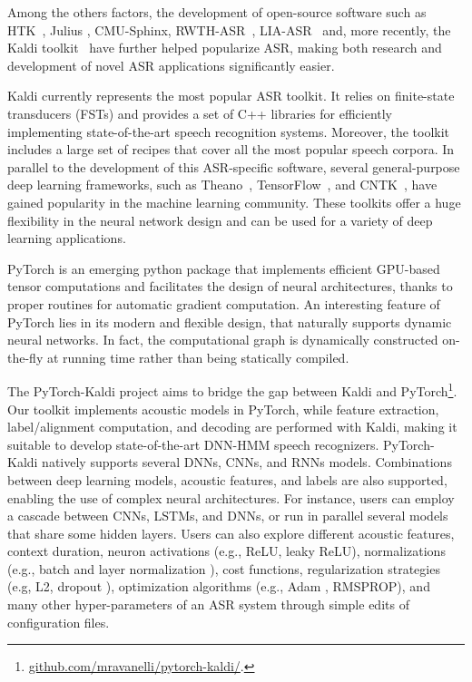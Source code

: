 \documentclass{article}
\begin{document}
Among the others factors, the development of open-source software such as HTK~\cite{htkbook}, Julius \cite{julius}, CMU-Sphinx, RWTH-ASR~\cite{rwth}, LIA-ASR~\cite{lia_asr}  and, more recently, the Kaldi toolkit~\cite{kaldi_short} have further helped popularize ASR, making both research and development of novel ASR applications significantly easier.  

Kaldi currently represents the most popular ASR toolkit. It relies on finite-state transducers (FSTs) \cite{mohri} and provides a set of C++ libraries for efficiently implementing state-of-the-art speech recognition systems. Moreover, the toolkit includes a large set of recipes that cover all the most popular speech corpora. In parallel to the development of this ASR-specific software, several general-purpose deep learning frameworks, such as Theano~\cite{theano}, TensorFlow~\cite{tensorflow}, and CNTK~\cite{CNTK}, have gained popularity in the machine learning community. These toolkits offer a huge flexibility in the neural network design and can be used for a variety of deep learning applications.

PyTorch \cite{PyTorch} is an emerging python package that implements efficient GPU-based tensor computations and facilitates the design of neural architectures, thanks to proper routines for automatic gradient computation. An interesting feature of PyTorch lies in its modern and flexible design, that naturally supports dynamic neural networks. In fact, the computational graph is dynamically constructed on-the-fly at running time rather than being statically compiled.

The PyTorch-Kaldi project aims to bridge the gap between Kaldi and PyTorch\footnote{\url{github.com/mravanelli/pytorch-kaldi/}.}. Our toolkit implements acoustic models in PyTorch, while feature extraction, label/alignment computation, and decoding are performed with Kaldi, making it suitable to develop state-of-the-art DNN-HMM speech recognizers.  PyTorch-Kaldi natively supports several DNNs, CNNs, and RNNs models. 
Combinations between deep learning models, acoustic features, and labels are also supported, enabling the use of complex neural architectures.  For instance, users can employ a cascade between CNNs, LSTMs, and DNNs, or run in parallel several models that share some hidden layers. Users can also explore different acoustic features, context duration, neuron activations (e.g., ReLU, leaky ReLU), normalizations (e.g., batch \cite{batchnorm} and layer normalization \cite{layer_norm}), cost functions, regularization strategies (e.g, L2, dropout \cite{dropout}), optimization algorithms (e.g., Adam \cite{adam}, RMSPROP), and many other hyper-parameters of an ASR system through simple edits of configuration files.
\end{document}
